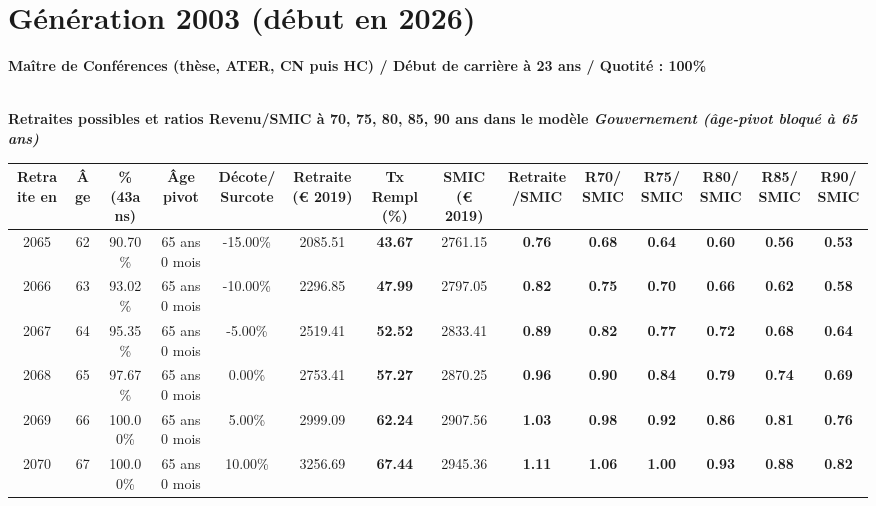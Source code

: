 \newpage 
 
\section{Génération 2003 (début en 2026)\label{MCF_100_23_2003_0}} 
 
{\bf \noindent Maître de Conférences (thèse, ATER, CN puis HC) / Début de carrière à 23 ans / Quotité : 100\%}  ~ 

 ~\\{\bf \noindent Retraites possibles et ratios Revenu/SMIC à 70, 75, 80, 85, 90 ans dans le modèle \emph{Gouvernement (âge-pivot bloqué à 65 ans)}}  
 
\begin{adjustbox}{max width=\textwidth} 
\begin{tabular}[htb]{|c|c||c|c|c||c|c||c|c||c|c|c|c|c|} 
\hline 
 Retraite en &  Âge &  \%(43ans) &  Âge pivot &  Décote/Surcote &  Retraite (\euro{} 2019) &  Tx Rempl(\%) &  SMIC (\euro{} 2019) &  Retraite/SMIC &  R70/SMIC &  R75/SMIC &  R80/SMIC &  R85/SMIC &  R90/SMIC \\ 
\hline \hline 
 2065 &  62 &  90.70\% &  65 ans 0 mois &  -15.00\% &  2085.51 &  {\bf 43.67} &  2761.15 &  {\bf {\color{red} 0.76}} &  {\bf {\color{red} 0.68}} &  {\bf {\color{red} 0.64}} &  {\bf {\color{red} 0.60}} &  {\bf {\color{red} 0.56}} &  {\bf {\color{red} 0.53}} \\ 
\hline 
 2066 &  63 &  93.02\% &  65 ans 0 mois &  -10.00\% &  2296.85 &  {\bf 47.99} &  2797.05 &  {\bf {\color{red} 0.82}} &  {\bf {\color{red} 0.75}} &  {\bf {\color{red} 0.70}} &  {\bf {\color{red} 0.66}} &  {\bf {\color{red} 0.62}} &  {\bf {\color{red} 0.58}} \\ 
\hline 
 2067 &  64 &  95.35\% &  65 ans 0 mois &  -5.00\% &  2519.41 &  {\bf 52.52} &  2833.41 &  {\bf {\color{red} 0.89}} &  {\bf {\color{red} 0.82}} &  {\bf {\color{red} 0.77}} &  {\bf {\color{red} 0.72}} &  {\bf {\color{red} 0.68}} &  {\bf {\color{red} 0.64}} \\ 
\hline 
 2068 &  65 &  97.67\% &  65 ans 0 mois &  0.00\% &  2753.41 &  {\bf 57.27} &  2870.25 &  {\bf {\color{red} 0.96}} &  {\bf {\color{red} 0.90}} &  {\bf {\color{red} 0.84}} &  {\bf {\color{red} 0.79}} &  {\bf {\color{red} 0.74}} &  {\bf {\color{red} 0.69}} \\ 
\hline 
 2069 &  66 &  100.00\% &  65 ans 0 mois &  5.00\% &  2999.09 &  {\bf 62.24} &  2907.56 &  {\bf 1.03} &  {\bf {\color{red} 0.98}} &  {\bf {\color{red} 0.92}} &  {\bf {\color{red} 0.86}} &  {\bf {\color{red} 0.81}} &  {\bf {\color{red} 0.76}} \\ 
\hline 
 2070 &  67 &  100.00\% &  65 ans 0 mois &  10.00\% &  3256.69 &  {\bf 67.44} &  2945.36 &  {\bf 1.11} &  {\bf 1.06} &  {\bf {\color{red} 1.00}} &  {\bf {\color{red} 0.93}} &  {\bf {\color{red} 0.88}} &  {\bf {\color{red} 0.82}} \\ 
\hline 
\hline 
\end{tabular} 
\end{adjustbox} 
 
